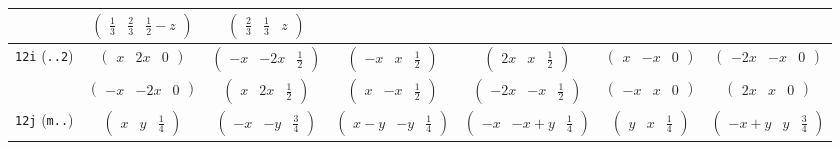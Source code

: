 \documentclass[fleqn,9pt,landscape]{jsarticle}
\begin{document}
\begin{center}
\begin{longtable}{ccccccc}
& $ \begin{pmatrix} \frac{1}{3} & \frac{2}{3} & \frac{1}{2} - z \end{pmatrix} $ & $ \begin{pmatrix} \frac{2}{3} & \frac{1}{3} & z \end{pmatrix} $ & $  $ & $  $ & $  $ & $  $ \\ \hline
{\tt 12i} ({\tt ..2}) & $ \begin{pmatrix} x & 2 x & 0 \end{pmatrix} $ & $ \begin{pmatrix} - x & - 2 x & \frac{1}{2} \end{pmatrix} $ & $ \begin{pmatrix} - x & x & \frac{1}{2} \end{pmatrix} $ & $ \begin{pmatrix} 2 x & x & \frac{1}{2} \end{pmatrix} $ & $ \begin{pmatrix} x & - x & 0 \end{pmatrix} $ & $ \begin{pmatrix} - 2 x & - x & 0 \end{pmatrix} $ \\
& $ \begin{pmatrix} - x & - 2 x & 0 \end{pmatrix} $ & $ \begin{pmatrix} x & 2 x & \frac{1}{2} \end{pmatrix} $ & $ \begin{pmatrix} x & - x & \frac{1}{2} \end{pmatrix} $ & $ \begin{pmatrix} - 2 x & - x & \frac{1}{2} \end{pmatrix} $ & $ \begin{pmatrix} - x & x & 0 \end{pmatrix} $ & $ \begin{pmatrix} 2 x & x & 0 \end{pmatrix} $ \\ \hline
{\tt 12j} ({\tt m..}) & $ \begin{pmatrix} x & y & \frac{1}{4} \end{pmatrix} $ & $ \begin{pmatrix} - x & - y & \frac{3}{4} \end{pmatrix} $ & $ \begin{pmatrix} x - y & - y & \frac{1}{4} \end{pmatrix} $ & $ \begin{pmatrix} - x & - x + y & \frac{1}{4} \end{pmatrix} $ & $ \begin{pmatrix} y & x & \frac{1}{4} \end{pmatrix} $ & $ \begin{pmatrix} - x + y & y & \frac{3}{4} \end{pmatrix} $ \\

\end{longtable}
\end{center}
\end{document}
